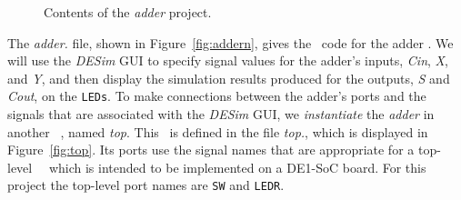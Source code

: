 \begin{figure}[h]
	\begin{center}
        \setlength{\fboxsep}{0pt}
        {}
        {}
	\end{center}
		  \caption{Contents of the {\it adder} project.}
	\label{fig:adder_files}
\end{figure}


The {\it adder.\hdlFileExt} file, shown in Figure~\ref{fig:addern}, gives the \hdlName~code
for the adder \hdlModuleName.  We will use the {\it DESim} GUI to specify signal 
values for the adder's inputs, {\it Cin}, {\it X}, and {\it Y}, and then display the
simulation results produced for the outputs, {\it S} and {\it Cout}, on the \texttt{LEDs}. 
To make connections between the adder's ports and the signals that are associated with the
{\it DESim} GUI, we {\it instantiate} the {\it adder} in another \hdlName~\hdlModuleName,
named {\it top}. This \hdlModuleName~is defined in the file {\it top.\hdlFileExt}, which
is displayed in Figure~\ref{fig:top}. Its ports use the signal names that are appropriate for a
top-level \hdlName~\hdlModuleName~which is intended to be implemented on a DE1-SoC board.
For this project the top-level port names are \texttt{SW} and  \texttt{LEDR}.

